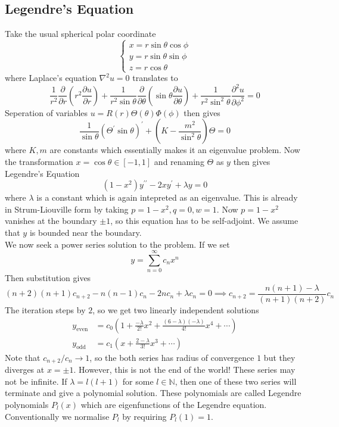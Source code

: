 \subsection{Legendre's Equation}
Take the usual spherical polar coordinate
$$\begin{cases}
    x=r\sin\theta\cos\phi\\
    y=r\sin\theta\sin\phi\\
    z=r\cos\theta
\end{cases}$$
where Laplace's equation $\nabla^2 u=0$ translates to
$$\frac{1}{r^2}\frac{\partial}{\partial r}\left( r^2\frac{\partial u}{\partial r} \right)+\frac{1}{r^2\sin\theta}\frac{\partial}{\partial\theta}\left( \sin\theta\frac{\partial u}{\partial\theta} \right)+\frac{1}{r^2\sin^2\theta}\frac{\partial^2u}{\partial\phi^2}=0$$
Seperation of variables $u=R(r)\Theta(\theta)\Phi(\phi)$ then gives
$$\frac{1}{\sin\theta}(\Theta^\prime\sin\theta)^\prime+\left( K-\frac{m^2}{\sin^2\theta} \right)\Theta=0$$
where $K,m$ are constants which essentially makes it an eigenvalue problem.
Now the transformation $x=\cos\theta\in[-1,1]$ and renaming $\Theta$ as $y$ then gives Legendre's Equation
$$(1-x^2)y^{\prime\prime}-2xy^\prime+\lambda y=0$$
where $\lambda$ is a constant which is again intepreted as an eigenvalue.
This is already in Strum-Liouville form by taking $p=1-x^2,q=0,w=1$.
Now $p=1-x^2$ vanishes at the boundary $\pm 1$, so this equation has to be self-adjoint.
We assume that $y$ is bounded near the boundary.\\
We now seek a power series solution to the problem.
If we set
$$y=\sum_{n=0}^\infty c_nx^n$$
Then substitution gives
$$(n+2)(n+1)c_{n+2}-n(n-1)c_n-2nc_n+\lambda c_n=0\implies c_{n+2}=\frac{n(n+1)-\lambda}{(n+1)(n+2)}c_n$$
The iteration steps by $2$, so we get two linearly independent solutions
\begin{align*}
    y_{\text{even}}&=c_0\left( 1+\frac{-\lambda}{2!}x^2+\frac{(6-\lambda)(-\lambda)}{4!}x^4+\cdots \right)\\
    y_{\text{odd}}&=c_1\left( x+\frac{2-\lambda}{3!}x^3+\cdots \right)
\end{align*}
Note that $c_{n+2}/c_n\to 1$, so the both series has radius of convergence $1$ but they diverges at $x=\pm 1$.
However, this is not the end of the world!
These series may not be infinite.
If $\lambda=l(l+1)$ for some $l\in\mathbb N$, then one of these two series will terminate and give a polynomial solution.
These polynomials are called Legendre polynomials $P_l(x)$ which are eigenfunctions of the Legendre equation.
Conventionally we normalise $P_l$ by requiring $P_l(1)=1$.

